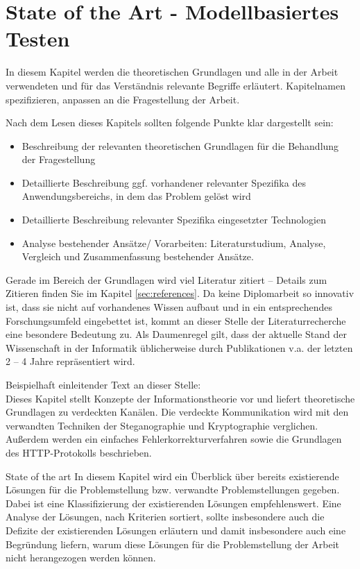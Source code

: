 \section{State of the Art - Modellbasiertes Testen}
In diesem Kapitel werden die theoretischen Grundlagen und alle in der Arbeit verwendeten und für das Verständnis relevante Begriffe erläutert. Kapitelnamen spezifizieren, anpassen an die Fragestellung der Arbeit.

\makeatletter\ifthesis@masterthesis
Nach dem Lesen dieses Kapitels sollten folgende Punkte klar dargestellt sein:
\begin{itemize}
	\item Beschreibung der relevanten theoretischen Grundlagen für die Behandlung der Fragestellung
	\item Detaillierte Beschreibung ggf. vorhandener relevanter Spezifika des Anwendungsbereichs, in dem das Problem gelöst wird
	\item Detaillierte Beschreibung relevanter Spezifika eingesetzter Technologien
	\item Analyse bestehender Ansätze/ Vorarbeiten: Literaturstudium, Analyse, Vergleich und Zusammenfassung bestehender Ansätze.
\end{itemize}
\fi\makeatother

Gerade im Bereich der Grundlagen wird viel Literatur zitiert -- Details zum Zitieren finden Sie im Kapitel \ref{sec:references}. Da keine Diplomarbeit so innovativ ist, dass sie nicht auf vorhandenes Wissen aufbaut und in ein entsprechendes Forschungsumfeld eingebettet ist, kommt an dieser Stelle der Literaturrecherche eine besondere Bedeutung zu. Als Daumenregel gilt, dass der aktuelle Stand der Wissenschaft in der Informatik üblicherweise durch Publikationen v.a. der letzten 2 – 4 Jahre repräsentiert wird.

\makeatletter\ifthesis@masterthesis
Beispielhaft einleitender Text an dieser Stelle:\\
Dieses Kapitel stellt Konzepte der Informationstheorie vor und liefert theoretische Grundlagen zu verdeckten Kanälen. Die verdeckte Kommunikation wird mit den verwandten Techniken der Steganographie und Kryptographie verglichen. Außerdem werden ein einfaches Fehlerkorrekturverfahren sowie die Grundlagen des HTTP-Protokolls beschrieben.
\fi\makeatother

State of the art
In diesem Kapitel wird ein Überblick über bereits existierende Lösungen für die Problemstellung bzw. verwandte Problemstellungen gegeben. Dabei ist eine Klassifizierung der existierenden Lösungen empfehlenswert. Eine Analyse der Lösungen, nach Kriterien sortiert, sollte insbesondere auch die Defizite der existierenden Lösungen erläutern und damit insbesondere auch eine Begründung liefern, warum diese Lösungen für die Problemstellung der Arbeit nicht herangezogen werden können.

